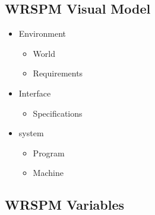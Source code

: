 \documentclass{article}
\begin{document}
    \subsection{WRSPM Visual Model}

    \begin{itemize}
        \item Environment
        \begin{itemize}
            \item World
            \item Requirements
        \end{itemize}
        \item Interface
        \begin{itemize}
            \item Specifications
        \end{itemize}
        \item system
        \begin{itemize}
            \item Program
            \item Machine
        \end{itemize}
    \end{itemize}

    \subsection{WRSPM Variables}
\end{document}
